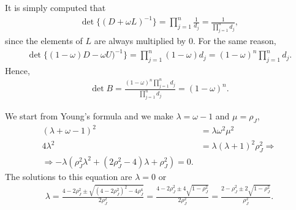 \begin{questions}

\begin{solution}
It is simply computed that
\begin{align*}
\det\{(D+\omega L)^{-1}\}=\prod_{j=1}^n\frac{1}{d_j}=\frac{1}{\prod_{j=1}^nd_j},
\end{align*}
since the elements of $L$ are always multiplied by 0. For the same reason,
\begin{align*}
\det\{(1-\omega)D-\omega U)^{-1}\}=\prod_{j=1}^n(1-\omega) d_j=(1-\omega)^n\prod_{j=1}^n d_j.
\end{align*}
Hence,
\begin{align*}
\det{B}=\frac{(1-\omega)^n\prod_{j=1}^n d_j}{\prod_{j=1}^n d_j}=(1-\omega)^n.
\end{align*}
\end{solution}
\begin{solution}
We start from Young's formula and we make $\lambda=\omega-1$ and $\mu=\rho_J$,
\begin{align*}
(\lambda+\omega-1)^2&=\lambda\omega^2\mu^2\\
4\lambda^2&=\lambda(\lambda+1)^2\rho_J^2\Rightarrow\\
\Rightarrow -\lambda\left(\rho_J^2\lambda^2+(2\rho_J^2-4)\lambda+\rho_J^2\right)=0.
\end{align*}
The solutions to this equation are $\lambda=0$ or
\begin{align*}
\lambda=\frac{4-2\rho_J^2\pm\sqrt{(4-2\rho_J^2)^2-4\rho_J^4}}{2\rho_J^2}=\frac{4-2\rho_J^2\pm
4\sqrt{1-\rho_J^2}}{2\rho_J^2}=\frac{2-\rho_J^2\pm
2\sqrt{1-\rho_J^2}}{\rho_J^2}.
\end{align*}

\end{solution}
\end{questions}
